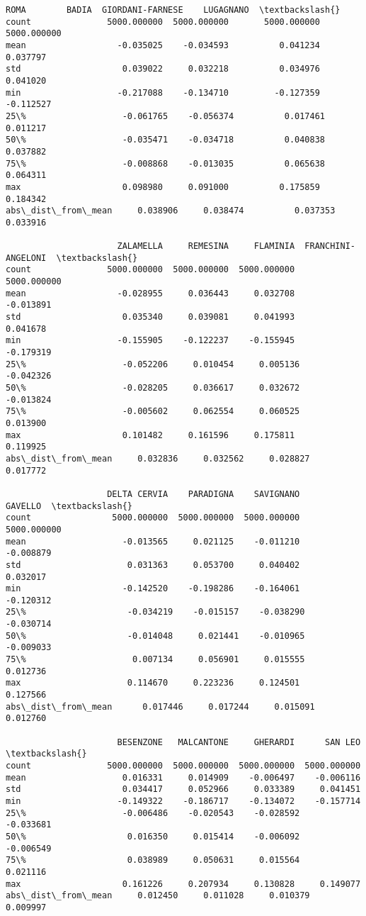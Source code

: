\documentclass[11pt]{article}
\begin{document}
\begin{tcolorbox}[breakable, size=fbox, boxrule=.5pt, pad at break*=1mm, opacityfill=0]
\begin{Verbatim}[commandchars=\\\{\}]
                           ROMA        BADIA  GIORDANI-FARNESE    LUGAGNANO  \textbackslash{}
count               5000.000000  5000.000000       5000.000000  5000.000000
mean                  -0.035025    -0.034593          0.041234     0.037797
std                    0.039022     0.032218          0.034976     0.041020
min                   -0.217088    -0.134710         -0.127359    -0.112527
25\%                   -0.061765    -0.056374          0.017461     0.011217
50\%                   -0.035471    -0.034718          0.040838     0.037882
75\%                   -0.008868    -0.013035          0.065638     0.064311
max                    0.098980     0.091000          0.175859     0.184342
abs\_dist\_from\_mean     0.038906     0.038474          0.037353     0.033916

                      ZALAMELLA     REMESINA     FLAMINIA  FRANCHINI-ANGELONI  \textbackslash{}
count               5000.000000  5000.000000  5000.000000         5000.000000
mean                  -0.028955     0.036443     0.032708           -0.013891
std                    0.035340     0.039081     0.041993            0.041678
min                   -0.155905    -0.122237    -0.155945           -0.179319
25\%                   -0.052206     0.010454     0.005136           -0.042326
50\%                   -0.028205     0.036617     0.032672           -0.013824
75\%                   -0.005602     0.062554     0.060525            0.013900
max                    0.101482     0.161596     0.175811            0.119925
abs\_dist\_from\_mean     0.032836     0.032562     0.028827            0.017772

                    DELTA CERVIA    PARADIGNA    SAVIGNANO      GAVELLO  \textbackslash{}
count                5000.000000  5000.000000  5000.000000  5000.000000
mean                   -0.013565     0.021125    -0.011210    -0.008879
std                     0.031363     0.053700     0.040402     0.032017
min                    -0.142520    -0.198286    -0.164061    -0.120312
25\%                    -0.034219    -0.015157    -0.038290    -0.030714
50\%                    -0.014048     0.021441    -0.010965    -0.009033
75\%                     0.007134     0.056901     0.015555     0.012736
max                     0.114670     0.223236     0.124501     0.127566
abs\_dist\_from\_mean      0.017446     0.017244     0.015091     0.012760

                      BESENZONE   MALCANTONE     GHERARDI      SAN LEO  \textbackslash{}
count               5000.000000  5000.000000  5000.000000  5000.000000
mean                   0.016331     0.014909    -0.006497    -0.006116
std                    0.034417     0.052966     0.033389     0.041451
min                   -0.149322    -0.186717    -0.134072    -0.157714
25\%                   -0.006486    -0.020543    -0.028592    -0.033681
50\%                    0.016350     0.015414    -0.006092    -0.006549
75\%                    0.038989     0.050631     0.015564     0.021116
max                    0.161226     0.207934     0.130828     0.149077
abs\_dist\_from\_mean     0.012450     0.011028     0.010379     0.009997


\end{Verbatim}
\end{tcolorbox}
\end{document}

